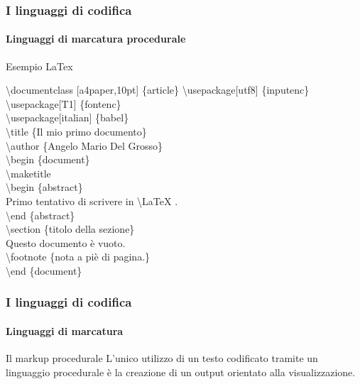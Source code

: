 \documentclass{beamer}
\begin{document}
\begin{frame}
	\frametitle{I linguaggi di codifica}
	\framesubtitle{Linguaggi di marcatura procedurale}
	\addtocounter{nframe}{1}

	\begin{block}{Esempio LaTex}
        \begin{tiny}
			\textbackslash documentclass [a4paper,10pt] \{article\} 
			\textbackslash usepackage[utf8] \{inputenc\}\\
			\textbackslash usepackage[T1] \{fontenc\}\\
			\textbackslash usepackage[italian] \{babel\}\\
			\textbackslash title \{Il mio primo documento\}\\
			\textbackslash author \{Angelo Mario Del Grosso\} \\
			\textbackslash begin \{document\}\\
			\textbackslash maketitle\\
			\textbackslash begin \{abstract\}\\
			 Primo tentativo di scrivere in \textbackslash LaTeX .\\
			\textbackslash end \{abstract\}\\
			\textbackslash section \{titolo della sezione\}\\
			Questo documento è vuoto.\\
			\textbackslash footnote \{nota a piè di pagina.\}\\
			\textbackslash end \{document\}\\
		\end{tiny}
	\end{block}

\end{frame}

\begin{frame}
	\frametitle{I linguaggi di codifica}
	\framesubtitle{Linguaggi di marcatura}
	\addtocounter{nframe}{1}

	\begin{block}{Il markup procedurale}
		L’unico utilizzo di un testo codificato tramite un linguaggio procedurale è la creazione di un output orientato alla visualizzazione.
	\end{block}
\end{frame}
\end{document}
